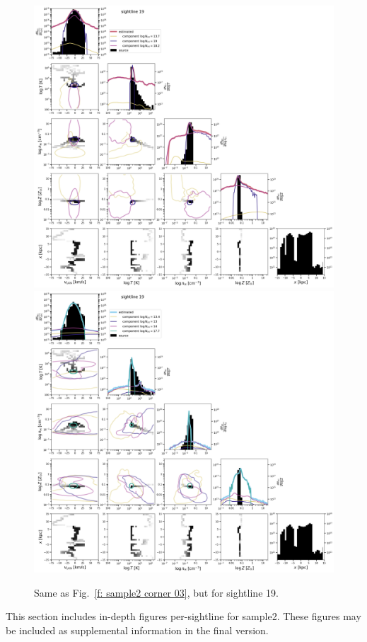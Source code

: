 \documentclass[fleqn,usenatbib]{mnras}
\begin{document}
\begin{figure}
    \centering
    \includegraphics[height=0.45\textheight]{figures/sample2/original/sightline_0019.png}
    \includegraphics[height=0.45\textheight]{figures/sample2/high-z/sightline_0019.png}
    \label{f: sample2 19 corner}
    \caption{Same as Fig.~\ref{f: sample2 corner 03}, but for sightline 19.}
\end{figure}

This section includes in-depth figures per-sightline for sample2.
These figures may be included as supplemental information in the final version.



\bsp	%
\label{lastpage}
\end{document}
